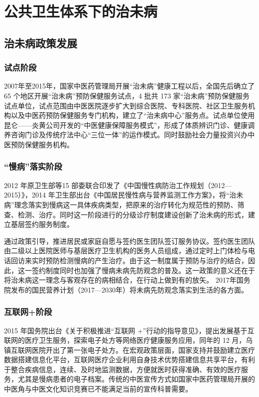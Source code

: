 \section{公共卫生体系下的治未病}
\subsection{治未病政策发展}
\subsubsection{试点阶段}
2007年至2015年，国家中医药管理局开展“治未病”健康工程以后，全国先后确立了 65 个地区开展“治未病”预防保健服务试点，4 批共 173 家“治未病”预防保健服务试点单位，试点范围由中医医院逐步扩大到综合医院、专科医院、社区卫生服务机构以及中医药预防保健服务专门机构，建立了“治未病中心”服务点。试点单位使用昆仑——炎黄公司开发的“中医健康保障服务模式”，形成了体质辨识门诊、健康调养咨询门诊及传统疗法中心“三位一体”的运作模式。同时鼓励社会力量投资兴办中医预防保健服务机构。
\subsubsection{“慢病”落实阶段}
2012 年原卫生部等15 部委联合印发了《中国慢性病防治工作规划（2012—2015）》，2014 年卫生部出台《中国居民慢性病与营养监测工作方案》，将“治未病”理念落实到慢病这一具体疾病类型，把原来的治疗转化为规范性的预防、筛查、检测、治疗。同时这一阶段进行的分级诊疗制度建设创新了治未病的形式，建立基层签约服务制度。

通过政策引导，推进居民或家庭自愿与签约医生团队签订服务协议。签约医生团队由二级以上医院医师与基层医疗卫生机构的医务人员组成，通过定时上门体检与电话回访来实时预防检测慢病的产生治疗。由于这一制度属于预防与治疗的结合，因此，这一签约制度同时也加强了慢病未病先防观念的普及。这一政策的意义还在于将治未病这一理念与客观存在的病相结合，在行动上做到有的放矢。
2017年国务院发布的国民营养计划（2017—2030年）将未病先防观念落实到生活的各方面。
\subsubsection{互联网+阶段}
2015 年国务院出台《关于积极推进“互联网 +”行动的指导意见》，提出发展基于互联网的医疗卫生服务，探索电子处方等网络医疗健康服务应用，同年的 12 月，乌镇互联网医院开出了第一张电子处方。在宏观政策层面，国家支持并鼓励建立医疗数据搭建信息化平台，互联网医疗企业利用自身技术优势搭建信息共享平台，有利于整合疾病信息，连续、及时地监测数据，方便就医时获得准确、有效的医疗服务，尤其是慢病患者的电子档案。传统的中医宣传方式如国家中医药管理局开展的中医角与中医文化知识竞赛已不能满足当前的宣传科普需要。

